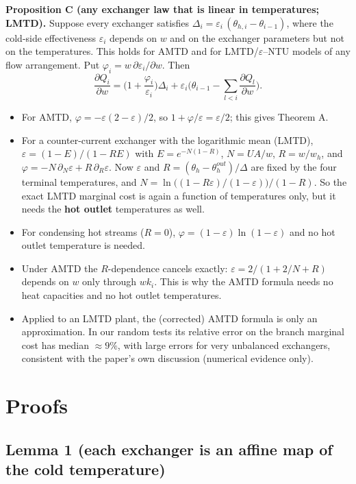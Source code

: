 \documentclass[11pt,a4paper]{report}
\begin{document}
\textbf{Proposition C (any exchanger law that is linear in temperatures; LMTD).} Suppose every exchanger satisfies
\(\Delta_i = \varepsilon_i\,(\theta_{h,i} - \theta_{i-1})\), where the cold-side effectiveness \(\varepsilon_i\)
depends on \(w\) and on the exchanger parameters but not on the temperatures. This holds for AMTD and for
LMTD/\(\varepsilon\)--NTU models of any flow arrangement. Put \(\varphi_i = w\,\partial\varepsilon_i/\partial w\). Then
\[\frac{\partial Q_i}{\partial w} = \Big(1 + \frac{\varphi_i}{\varepsilon_i}\Big)\Delta_i + \varepsilon_i\Big(\theta_{i-1} - \sum_{l<i}\frac{\partial Q_l}{\partial w}\Big).\]
\begin{itemize}
\item For AMTD, \(\varphi = -\varepsilon(2-\varepsilon)/2\), so \(1 + \varphi/\varepsilon = \varepsilon/2\); this gives
Theorem A.
\item For a counter-current exchanger with the logarithmic mean (LMTD), \(\varepsilon = (1-E)/(1-RE)\) with
\(E = e^{-N(1-R)}\), \(N = UA/w\), \(R = w/w_h\), and \(\varphi = -N\,\partial_N\varepsilon + R\,\partial_R\varepsilon\).
Now \(\varepsilon\) and \(R = (\theta_h - \theta^{out}_h)/\Delta\) are fixed by the four terminal temperatures, and
\(N = \ln\!\big((1 - R\varepsilon)/(1-\varepsilon)\big)/(1-R)\). So the exact LMTD marginal cost is again a function of
temperatures only, but it needs the \textbf{hot outlet} temperatures as well.
\item For condensing hot streams (\(R = 0\)), \(\varphi = (1-\varepsilon)\ln(1-\varepsilon)\) and no hot outlet
temperature is needed.
\item Under AMTD the \(R\)-dependence cancels exactly: \(\varepsilon = 2/(1 + 2/N + R)\) depends on \(w\) only through
\(w k_i\). This is why the AMTD formula needs no heat capacities and no hot outlet temperatures.
\item Applied to an LMTD plant, the (corrected) AMTD formula is only an approximation. In our random tests its relative
error on the branch marginal cost has median \(\approx 9\%\), with large errors for very unbalanced exchangers,
consistent with the paper's own discussion (numerical evidence only).
\end{itemize}

\section{Proofs}

\subsection{Lemma 1 (each exchanger is an affine map of the cold temperature)}
\end{document}
